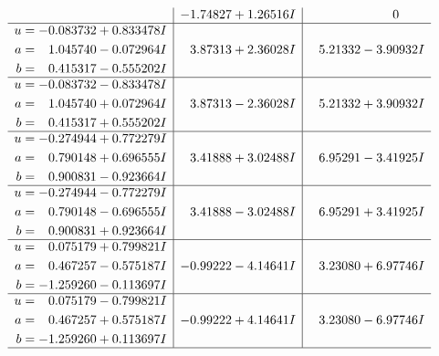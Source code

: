 \documentclass[1p]{elsarticle_modified}
\theoremstyle{definition}
\begin{document}
$$\begin{array}{c|c|c}
 & -1.74827 + 1.26516 I & \phantom{-0.000000 } 0 \\ \hline\begin{aligned}
u &= -0.083732 + 0.833478 I \\
a &= \phantom{-}1.045740 - 0.072964 I \\
b &= \phantom{-}0.415317 - 0.555202 I\end{aligned}
 & \phantom{-}3.87313 + 2.36028 I & \phantom{-}5.21332 - 3.90932 I \\ \hline\begin{aligned}
u &= -0.083732 - 0.833478 I \\
a &= \phantom{-}1.045740 + 0.072964 I \\
b &= \phantom{-}0.415317 + 0.555202 I\end{aligned}
 & \phantom{-}3.87313 - 2.36028 I & \phantom{-}5.21332 + 3.90932 I \\ \hline\begin{aligned}
u &= -0.274944 + 0.772279 I \\
a &= \phantom{-}0.790148 + 0.696555 I \\
b &= \phantom{-}0.900831 - 0.923664 I\end{aligned}
 & \phantom{-}3.41888 + 3.02488 I & \phantom{-}6.95291 - 3.41925 I \\ \hline\begin{aligned}
u &= -0.274944 - 0.772279 I \\
a &= \phantom{-}0.790148 - 0.696555 I \\
b &= \phantom{-}0.900831 + 0.923664 I\end{aligned}
 & \phantom{-}3.41888 - 3.02488 I & \phantom{-}6.95291 + 3.41925 I \\ \hline\begin{aligned}
u &= \phantom{-}0.075179 + 0.799821 I \\
a &= \phantom{-}0.467257 - 0.575187 I \\
b &= -1.259260 - 0.113697 I\end{aligned}
 & -0.99222 - 4.14641 I & \phantom{-}3.23080 + 6.97746 I \\ \hline\begin{aligned}
u &= \phantom{-}0.075179 - 0.799821 I \\
a &= \phantom{-}0.467257 + 0.575187 I \\
b &= -1.259260 + 0.113697 I\end{aligned}
 & -0.99222 + 4.14641 I & \phantom{-}3.23080 - 6.97746 I\\
 \hline 
 \end{array}$$\newpage$$\begin{array}{c|c|c}  

\end{array}$$
\end{document}
